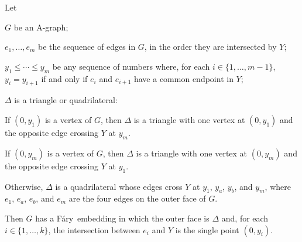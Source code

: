 \documentclass{patmorin}
\newcommand{\Fary}{Fáry}
\begin{document}
%
%

\begin{thm}
   Let
   \begin{compactenum}
     \item $G$ be an A-graph;
     \item $e_1,\ldots,e_m$ be the sequence of edges in $G$,
           in the order they are intersected by $Y$;
     \item $y_1\le\cdots\le y_m$ be any sequence of numbers where, for
           each $i\in\{1,\ldots,m-1\}$, $y_i=y_{i+1}$ if and only if $e_i$
           and $e_{i+1}$ have a common endpoint in $Y$;
     \item $\Delta$ is a triangle or quadrilateral:
\begin{compactenum}
   \item If $(0,y_1)$ is a vertex of $G$, then $\Delta$ is a triangle
   with one vertex at $(0,y_1)$ and the opposite edge crossing $Y$ at $y_m$.

   \item If $(0,y_m)$ is a vertex of $G$, then $\Delta$ is a triangle
   with one vertex at $(0,y_m)$ and the opposite edge crossing $Y$ at $y_1$.

   \item Otherwise,
      $\Delta$ is a quadrilateral whose edges cross $Y$ at $y_1$, $y_a$,
      $y_b$, and $y_m$, where $e_1$, $e_a$, $e_b$, and $e_m$ are the four edges on the outer face of $G$.
\end{compactenum}
   \end{compactenum}
   Then $G$ has a
   \Fary\ embedding in which the outer face is $\Delta$
   and, for each $i\in\{1,\ldots,k\}$, the intersection between $e_i$ and $Y$
   is the single point $(0,y_i)$.
\end{thm}
\end{document}

